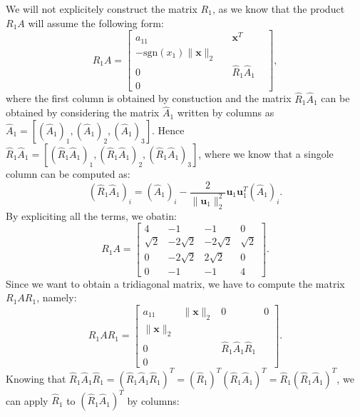 \documentclass[a4paper,11pt]{article}
\begin{document}
We will not explicitely construct the matrix $R_1$, as we know that the product $R_1 A$ will assume the following form:
\begin{equation}\label{key}
	R_1 A= \left[ 
	\begin{array}{c|ccc}
		a_{11} &  & \textbf{x}^T  &  \\
		\hline
		-\text{sgn}(x_1) \lVert \textbf{x}\rVert_2  &  &  &  \\
		0 &  & \hat{R}_1 \hat{A}_1 &  \\
		0 &  &  & 
	\end{array}\right] ,
\end{equation}
where the first column is obtained by constuction and the matrix $\hat{R}_1\hat{A}_1$ can be obtained by considering the matrix $\hat{A}_1$ written by columns as $\hat{A}_1 = \left[ ( \hat{A}_1)_1,( \hat{A}_1)_2,( \hat{A}_1)_3 \right] $. Hence $\hat{R}_1\hat{A}_1 = \left[ ( \hat{R}_1\hat{A}_1)_1,( \hat{R}_1\hat{A}_1)_2,(\hat{R}_1 \hat{A}_1)_3 \right] $, where we know that a singole column can be computed as:
\begin{equation}\label{key}
	( \hat{R}_1\hat{A}_1)_i = (\hat{A}_1)_i - \frac{2}{\lVert \textbf{u}_1\rVert_2^2} \textbf{u}_1 \textbf{u}_1^T(\hat{A}_1)_i .
\end{equation}
By expliciting all the terms, we obatin:
\begin{equation}\label{key}
	R_1 A = \begin{bmatrix}
		4 & -1 & -1 & 0 \\
		\sqrt{2} & -2\sqrt{2} & -2\sqrt{2} & \sqrt{2} \\
		0 & -2\sqrt{2} & 2\sqrt{2} & 0 \\
		0 & -1 & -1 & 4
	\end{bmatrix}.
\end{equation}
Since we want to obtain a tridiagonal matrix, we have to compute the matrix $R_1 A R_1$, namely:
\begin{equation}\label{key}
	R_1 A R_1 = \left[ 
	\begin{array}{c|ccc}
		a_{11} &  \lVert \textbf{x}\rVert_2 &  0 & 0 \\
		\hline
		 \lVert \textbf{x}\rVert_2  &  &  &  \\
		0 &  & \hat{R}_1 \hat{A}_1 \hat{R}_1  &  \\
		0 &  &  & 
	\end{array}\right].
\end{equation}
 Knowing that $\hat{R}_1 \hat{A}_1 \hat{R}_1 = (\hat{R}_1 \hat{A}_1 \hat{R}_1)^T = (\hat{R}_1)^T (\hat{R}_1 \hat{A}_1 )^T =\hat{R}_1 (\hat{R}_1 \hat{A}_1 )^T$, we can apply $\hat{R}_1$ to $(\hat{R}_1 \hat{A}_1 )^T$ by columns:
\end{document}
